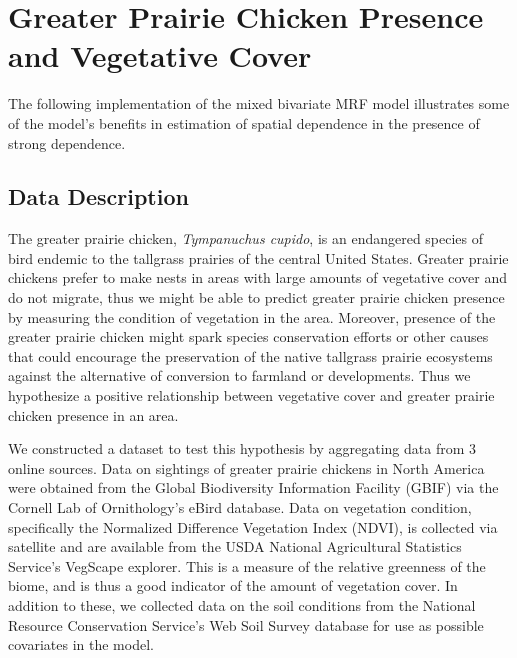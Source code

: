 \documentclass[12pt, a4paper, twoside]{article}
\begin{document}
\section{Greater Prairie Chicken Presence and Vegetative Cover} \label{ChickenAnalysis}
The following implementation of the mixed bivariate MRF model illustrates some of the model's benefits in estimation of spatial dependence in the presence of strong dependence.
\subsection{Data Description}
The greater prairie chicken, \textit{Tympanuchus cupido}, is an endangered species of bird endemic to the tallgrass prairies of the central United States. Greater prairie chickens prefer to make nests in areas with large amounts of vegetative cover and do not migrate, thus we might be able to predict greater prairie chicken presence by measuring the condition of vegetation in the area. Moreover, presence of the greater prairie chicken might spark species conservation efforts or other causes that could encourage the preservation of the native tallgrass prairie ecosystems against the alternative of conversion to farmland or developments. Thus we hypothesize a positive relationship between vegetative cover and greater prairie chicken presence in an area.

We constructed a dataset to test this hypothesis by aggregating data from 3 online sources. Data on sightings of greater prairie chickens in North America were obtained from the Global Biodiversity Information Facility (GBIF) via the Cornell Lab of Ornithology's eBird database. Data on vegetation condition, specifically the Normalized Difference Vegetation Index (NDVI), is collected via satellite and are available from the USDA National Agricultural Statistics Service's VegScape explorer. This is a measure of the relative greenness of the biome, and is thus a good indicator of the amount of vegetation cover. In addition to these, we collected data on the soil conditions from the National Resource Conservation Service's Web Soil Survey database for use as possible covariates in the model.
\end{document}
